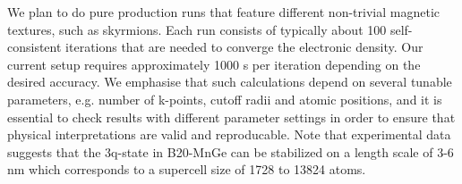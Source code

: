 \documentclass [a4paper, 12pt]{article}
\begin{document}

We plan to do pure production runs that feature different non-trivial magnetic textures, such as skyrmions.
Each run consists of typically about 100 self-consistent iterations that are needed to converge
the electronic density. Our current setup requires approximately 1000 s per iteration depending on the desired
accuracy. We emphasise that such calculations depend on several tunable parameters, e.g. number of
k-points, cutoff radii and atomic positions, and it is essential to check results with different parameter
settings in order to ensure that physical interpretations are valid and reproducable. 
Note that
experimental data suggests that the 3q-state in B20-MnGe can be stabilized on a length scale 
of 3-6 nm which corresponds to a supercell size of
1728 to 13824 atoms.



\bigskip
\end{document}
